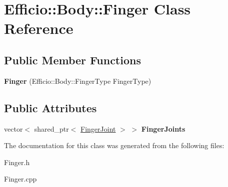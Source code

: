 \hypertarget{class_efficio_1_1_body_1_1_finger}{}\section{Efficio\+:\+:Body\+:\+:Finger Class Reference}
\label{class_efficio_1_1_body_1_1_finger}
\subsection*{Public Member Functions}
\begin{DoxyCompactItemize}
\item 
{\bfseries Finger} (Efficio\+::\+Body\+::\+Finger\+Type Finger\+Type)\hypertarget{class_efficio_1_1_body_1_1_finger_a8c1feda91fe3b1ef8325155b0f337cd2}{}\label{class_efficio_1_1_body_1_1_finger_a8c1feda91fe3b1ef8325155b0f337cd2}

\end{DoxyCompactItemize}
\subsection*{Public Attributes}
\begin{DoxyCompactItemize}
\item 
vector$<$ shared\+\_\+ptr$<$ \hyperlink{class_efficio_1_1_finger_joint}{Finger\+Joint} $>$ $>$ {\bfseries Finger\+Joints}\hypertarget{class_efficio_1_1_body_1_1_finger_a683de8824b30dce1f90ed97352e494df}{}\label{class_efficio_1_1_body_1_1_finger_a683de8824b30dce1f90ed97352e494df}

\end{DoxyCompactItemize}


The documentation for this class was generated from the following files\+:\begin{DoxyCompactItemize}
\item 
Finger.\+h\item 
Finger.\+cpp\end{DoxyCompactItemize}
